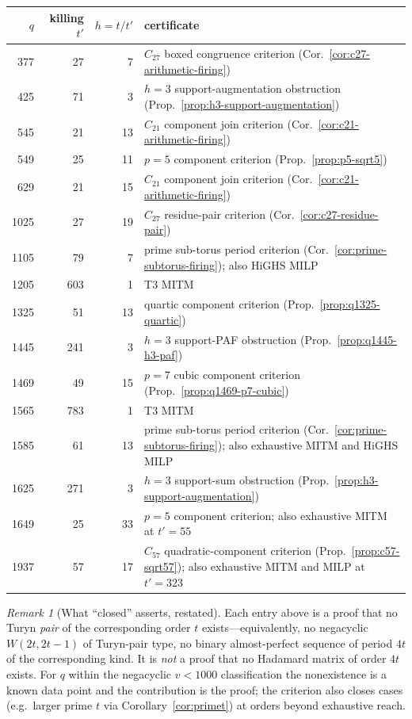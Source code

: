 \documentclass[11pt]{article}
\theoremstyle{plain}
\theoremstyle{definition}
\theoremstyle{remark}
\newtheorem{remark}[theorem]{Remark}
\begin{document}
\begin{center}
\small
\begin{tabular}{r r r l}
$q$ & killing $t'$ & $h=t/t'$ & certificate\\
\hline
377 & 27 & 7 & $C_{27}$ boxed congruence criterion (Cor.~\ref{cor:c27-arithmetic-firing})\\
425 & 71 & 3 & $h=3$ support-augmentation obstruction (Prop.~\ref{prop:h3-support-augmentation})\\
545 & 21 & 13 & $C_{21}$ component join criterion (Cor.~\ref{cor:c21-arithmetic-firing})\\
549 & 25 & 11 & $p=5$ component criterion (Prop.~\ref{prop:p5-sqrt5})\\
629 & 21 & 15 & $C_{21}$ component join criterion (Cor.~\ref{cor:c21-arithmetic-firing})\\
1025 & 27 & 19 & $C_{27}$ residue-pair criterion (Cor.~\ref{cor:c27-residue-pair})\\
1105 & 79 & 7 & prime sub-torus period criterion (Cor.~\ref{cor:prime-subtorus-firing}); also HiGHS MILP\\
1205 & 603 & 1 & T3 MITM\\
1325 & 51 & 13 & quartic component criterion (Prop.~\ref{prop:q1325-quartic})\\
1445 & 241 & 3 & $h=3$ support-PAF obstruction (Prop.~\ref{prop:q1445-h3-paf})\\
1469 & 49 & 15 & $p=7$ cubic component criterion (Prop.~\ref{prop:q1469-p7-cubic})\\
1565 & 783 & 1 & T3 MITM\\
1585 & 61 & 13 & prime sub-torus period criterion (Cor.~\ref{cor:prime-subtorus-firing}); also exhaustive MITM and HiGHS MILP\\
1625 & 271 & 3 & $h=3$ support-sum obstruction (Prop.~\ref{prop:h3-support-augmentation})\\
1649 & 25 & 33 & $p=5$ component criterion; also exhaustive MITM at $t'=55$\\
1937 & 57 & 17 & $C_{57}$ quadratic-component criterion (Prop.~\ref{prop:c57-sqrt57}); also exhaustive MITM and MILP at $t'=323$\\
\end{tabular}
\end{center}

\begin{remark}[What ``closed'' asserts, restated]\label{rem:closed-restated}
Each entry above is a proof that no Turyn \emph{pair} of the corresponding order
$t$ exists---equivalently, no negacyclic $W(2t,2t-1)$ of Turyn-pair type, no
binary almost-perfect sequence of period $4t$ of the corresponding kind. It is
\emph{not} a proof that no Hadamard matrix of order $4t$ exists. For $q$ within
the negacyclic $v<1000$ classification the nonexistence is a known data point
and the contribution is the proof; the criterion also closes cases (e.g.\ larger
prime $t$ via Corollary~\ref{cor:primet}) at orders beyond exhaustive reach.
\end{remark}
\end{document}
